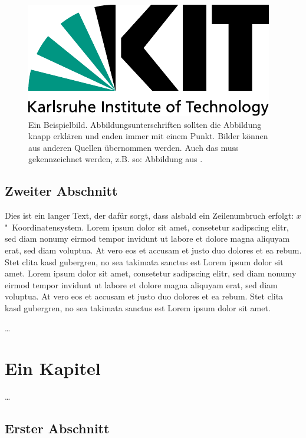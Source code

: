 \begin{figure}
	\begin{center}
		\includegraphics[width=.3\textwidth]{logos/KITLogo_RGB.pdf}
		\caption{Ein Beispielbild. Abbildungsunterschriften sollten die Abbildung knapp erklären und enden immer mit einem Punkt.
			Bilder können aus anderen Quellen übernommen werden.
			Auch das muss gekennzeichnet werden, z.B. so: Abbildung aus \cite{becker2008a}.}
	\end{center}
	\label{fig:beispielbild}
\end{figure}


\section{Zweiter Abschnitt}
Dies ist ein langer Text, der dafür sorgt, dass alsbald ein Zeilenumbruch erfolgt: $x$"~Koordinatensystem.
Lorem ipsum dolor sit amet, consetetur sadipscing elitr, sed diam nonumy eirmod tempor invidunt ut labore et dolore magna aliquyam erat, sed diam voluptua.
At vero eos et accusam et justo duo dolores et ea rebum.
Stet clita kasd gubergren, no sea takimata sanctus est Lorem ipsum dolor sit amet.
Lorem ipsum dolor sit amet, consetetur sadipscing elitr, sed diam nonumy eirmod tempor invidunt ut labore et dolore magna aliquyam erat, sed diam voluptua.
At vero eos et accusam et justo duo dolores et ea rebum. Stet clita kasd gubergren, no sea takimata sanctus est Lorem ipsum dolor sit amet.

\dots



\chapter{Ein Kapitel}
\label{ch:Content2}

\dots


\section{Erster Abschnitt}
\label{ch:Content2:sec:Section1}

